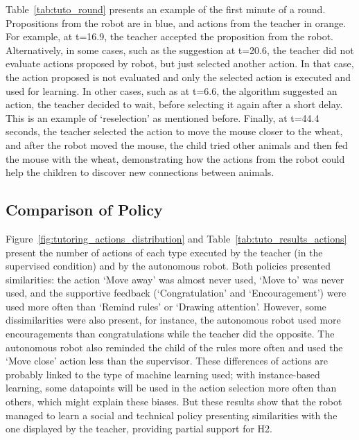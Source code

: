 Table~\ref{tab:tuto_round} presents an example of the first minute of a round. Propositions from the robot are in blue, and actions from the teacher in orange. For example, at t=16.9, the teacher accepted the proposition from the robot. Alternatively, in some cases, such as the suggestion at t=20.6, the teacher did not evaluate actions proposed by robot, but just selected another action. In that case, the action proposed is not evaluated and only the selected action is executed and used for learning. In other cases, such as at t=6.6, the algorithm suggested an action, the teacher decided to wait, before selecting it again after a short delay. This is an example of `reselection' as mentioned before. Finally, at t=44.4 seconds, the teacher selected the action to move the mouse closer to the wheat, and after the robot moved the mouse, the child tried other animals and then fed the mouse with the wheat, demonstrating how the actions from the robot could help the children to discover new connections between animals.

\subsection{Comparison of Policy}

Figure~\ref{fig:tutoring_actions_distribution} and Table~\ref{tab:tuto_results_actions} present the number of actions of each type executed by the teacher (in the supervised condition) and by the autonomous robot. Both policies presented similarities: the action `Move away' was almost never used, `Move to' was never used, and the supportive feedback (`Congratulation' and `Encouragement') were used more often than `Remind rules' or `Drawing attention'. However, some dissimilarities were also present, for instance, the autonomous robot used more encouragements than congratulations while the teacher did the opposite. The autonomous robot also reminded the child of the rules more often and used the `Move close' action less than the supervisor. These differences of actions are probably linked to the type of machine learning used; with instance-based learning, some datapoints will be used in the action selection more often than others, which might explain these biases. But these results show that the robot managed to learn a social and technical policy presenting similarities with the one displayed by the teacher, providing partial support for H2.

